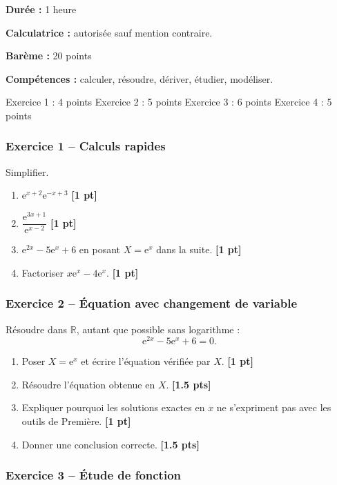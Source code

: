 \documentclass[11pt,a4paper]{article}
\newcommand{\R}{\mathbb{R}}
\newcommand{\e}{\mathrm{e}}
\newcommand{\pts}[1]{\hfill \textbf{[#1 pt]}}
\newcommand{\ptss}[1]{\hfill \textbf{[#1 pts]}}
\newcommand{\competences}[1]{\textbf{Compétences :} #1}
\newcommand{\calculatrice}{\textbf{Calculatrice :} autorisée sauf mention contraire.}
\newcommand{\duree}[1]{\textbf{Durée :} #1}
\newcommand{\bareme}[1]{\textbf{Barème :} #1}
\begin{document}
\begin{sujetbox}
\duree{1 heure}

\calculatrice

\bareme{20 points}

\competences{calculer, résoudre, dériver, étudier, modéliser.}
\end{sujetbox}

\begin{baremebox}
Exercice 1 : 4 points \quad
Exercice 2 : 5 points \quad
Exercice 3 : 6 points \quad
Exercice 4 : 5 points
\end{baremebox}

\subsubsection*{Exercice 1 -- Calculs rapides}

Simplifier.
\begin{enumerate}
    \item $\e^{x+2}\e^{-x+3}$ \pts{1}
    \item $\dfrac{\e^{3x+1}}{\e^{x-2}}$ \pts{1}
    \item $\e^{2x}-5\e^x+6$ en posant $X=\e^x$ dans la suite. \pts{1}
    \item Factoriser $x\e^x-4\e^x$. \pts{1}
\end{enumerate}

\subsubsection*{Exercice 2 -- Équation avec changement de variable}

Résoudre dans $\R$, autant que possible sans logarithme :
\[
\e^{2x}-5\e^x+6=0.
\]
\begin{enumerate}
    \item Poser $X=\e^x$ et écrire l'équation vérifiée par $X$. \pts{1}
    \item Résoudre l'équation obtenue en $X$. \ptss{1.5}
    \item Expliquer pourquoi les solutions exactes en $x$ ne s'expriment pas avec les outils de Première. \pts{1}
    \item Donner une conclusion correcte. \ptss{1.5}
\end{enumerate}

\subsubsection*{Exercice 3 -- Étude de fonction}
\end{document}

